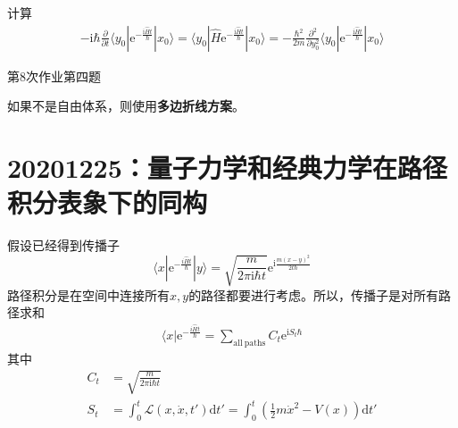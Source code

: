         计算
        \begin{align*}
            -\mathrm{i}\hbar \frac {\partial}{\partial t} \langle y_0 | \mathrm{e}^{-\frac {\mathrm{i}\hat{H}t}{\hbar}} |x_0 \rangle =  \langle y_0 | \hat{H} \mathrm{e}^{-\frac {\mathrm{i}\hat{H}t}{\hbar}} |x_0 \rangle
            = -\frac {\hbar^2}{2m} \frac {\partial^2}{\partial y_0^2} \langle y_0 | \mathrm{e}^{-\frac {\mathrm{i}\hat{H}t}{\hbar}} |x_0 \rangle
        \end{align*}

        \begin{asg}
            第8次作业第四题
        \end{asg}

        如果不是自由体系，则使用\textbf{多边折线方案}。

    \section{20201225：量子力学和经典力学在路径积分表象下的同构}
        假设已经得到传播子
        \begin{equation*}
            \langle x | \mathrm{e}^{-\frac {i \hat{H}t}{\hbar}} |y \rangle = \sqrt{\frac m{2\pi \mathrm{i}\hbar t}} \mathrm{e}^{\mathrm{i}\frac {m(x-y)^2}{2t\hbar}}
        \end{equation*}
        路径积分是在空间中连接所有$x,y$的路径都要进行考虑。所以，传播子是对所有路径求和
        \begin{align*}
            \langle x | \mathrm{e}^{-\frac {i \hat{H}t}{\hbar}} = \sum_{\mathrm{all~paths}} C_t \mathrm{e}^{\mathrm{i}S_t\hbar}
        \end{align*}
        其中 
        \begin{align*}
            C_t &= \sqrt{\frac m{2\pi \mathrm{i}\hbar t}} \\
            S_t &= \int_0^t \mathcal{L}(x,\dot{x},t') \mathrm{d}t' = \int_0^t (\frac 12 m \dot{x}^2 - V(x)) \mathrm{d}t'
        \end{align*}


